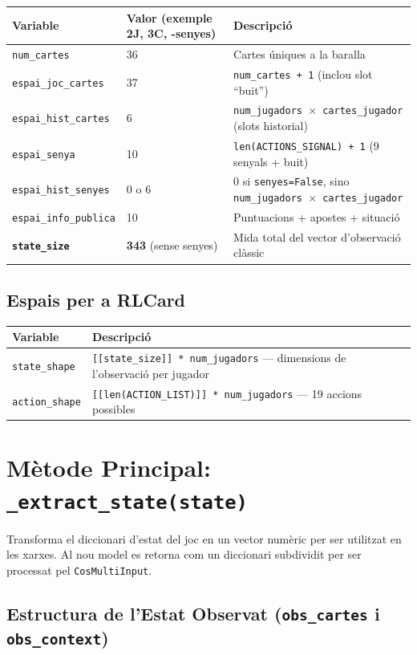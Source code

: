 \documentclass[a4paper,11pt]{report}
\begin{document}
\begin{longtable}{|l|l|p{6cm}|}
\hline
\textbf{Variable} & \textbf{Valor} (exemple 2J, 3C, -senyes) & \textbf{Descripció} \\
\hline
\texttt{num\_cartes} & 36 & Cartes úniques a la baralla \\
\texttt{espai\_joc\_cartes} & 37 & \texttt{num\_cartes + 1} (inclou slot ``buit'') \\
\texttt{espai\_hist\_cartes} & 6 & \texttt{num\_jugadors $\times$ cartes\_jugador} (slots historial) \\
\texttt{espai\_senya} & 10 & \texttt{len(ACTIONS\_SIGNAL) + 1} (9 senyals + buit) \\
\texttt{espai\_hist\_senyes} & 0 o 6 & 0 si \texttt{senyes=False}, sino \texttt{num\_jugadors $\times$ cartes\_jugador} \\
\texttt{espai\_info\_publica} & 10 & Puntuacions + apostes + situació \\
\textbf{\texttt{state\_size}} & \textbf{343} (sense senyes) & Mida total del vector d'observació clàssic \\
\hline
\end{longtable}

\subsection{Espais per a RLCard}

\begin{longtable}{|l|p{10cm}|}
\hline
\textbf{Variable} & \textbf{Descripció} \\
\hline
\texttt{state\_shape} & \texttt{[[state\_size]] * num\_jugadors} --- dimensions de l'observació per jugador \\
\texttt{action\_shape} & \texttt{[[len(ACTION\_LIST)]] * num\_jugadors} --- 19 accions possibles \\
\hline
\end{longtable}

\hrulefill

\section{Mètode Principal: \texttt{\_extract\_state(state)}}

Transforma el diccionari d'estat del joc en un vector numèric per ser utilitzat en les xarxes. Al nou model es retorna com un diccionari subdividit per ser processat pel \texttt{CosMultiInput}.

\subsection{Estructura de l'Estat Observat (\texttt{obs\_cartes} i \texttt{obs\_context})}
\end{document}
